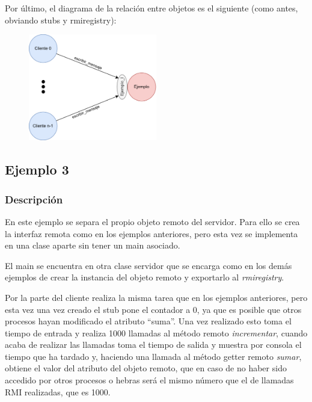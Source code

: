 \documentclass{article}
\begin{document}
Por último, el diagrama de la relación entre objetos es el siguiente (como antes, obviando stubs y rmiregistry):

\begin{figure}[H]
    \centering
    \includegraphics[width=0.5\textwidth]{imagenes/E2Diagrama.png}
\end{figure}

\subsection{Ejemplo 3}
\subsubsection{Descripción}
En este ejemplo se separa el propio objeto remoto del servidor. Para ello se crea la interfaz remota como en los ejemplos anteriores, pero esta vez se implementa en una clase aparte sin tener un main asociado.

El main se encuentra en otra clase servidor que se encarga como en los demás ejemplos de crear la instancia del objeto remoto y exportarlo al \textit{rmiregistry}.

\bigskip

Por la parte del cliente realiza la misma tarea que en los ejemplos anteriores, pero esta vez una vez creado el stub pone el contador a 0, ya que es posible que otros procesos hayan modificado el atributo ``suma''. Una vez realizado esto toma el tiempo de entrada y realiza 1000 llamadas al método remoto \textit{incrementar}, cuando acaba de realizar las llamadas toma el tiempo de salida y muestra por consola el tiempo que ha tardado y, haciendo una llamada al método getter remoto \textit{sumar}, obtiene el valor del atributo del objeto remoto, que en caso de no haber sido accedido por otros procesos o hebras será el mismo número que el de llamadas RMI realizadas, que es 1000.

\end{document}
